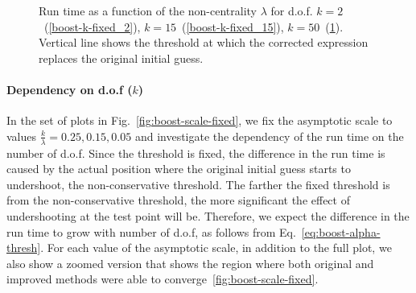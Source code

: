 \documentclass[final,5p,twocolumn,times,authoryear]{elsarticle}
\begin{document}
\begin{figure}[h]
\begin{subfigure}[t]{0.35\textwidth}
		\caption{}\label{boost-k-fixed_50}
	\end{subfigure}
    \caption{Run time as a function of the non-centrality $\lambda$ for d.o.f. $k=2$~(\ref{boost-k-fixed_2}), $k=15$~(\ref{boost-k-fixed_15}), $k=50$~(\ref{boost-k-fixed_50}). Vertical line shows the threshold at which the corrected expression replaces the original initial guess.}\label{fig:boost-k-fixed}
\end{figure}
%
\paragraph{Dependency on d.o.f ($k$)} In the set of plots in Fig.~\ref{fig:boost-scale-fixed}, we fix the asymptotic scale to values $\frac{k}{\lambda} = 0.25, 0.15, 0.05$ and investigate the dependency of the run time on the number of d.o.f. Since the threshold is fixed, the difference in the run time is caused by the actual position where the original initial guess starts to undershoot, the non-conservative threshold. The farther the fixed threshold is from the non-conservative threshold, the more significant the effect of undershooting at the test point will be. Therefore, we expect the difference in the run time to grow with number of d.o.f, as follows from Eq.~\ref{eq:boost-alpha-thresh}. For each value of the asymptotic scale, in addition to the full plot, we also show a zoomed version that shows the region where both original and improved methods were able to converge~\ref{fig:boost-scale-fixed}.
%
\end{document}
